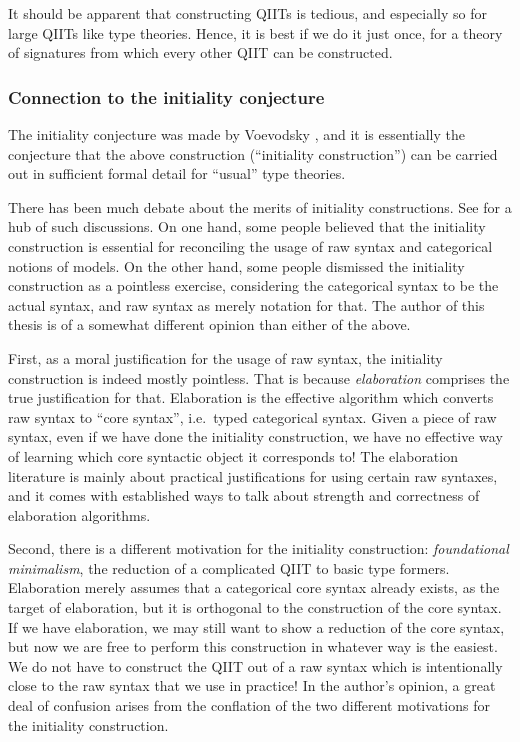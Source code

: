 \documentclass[12pt,a4paper,twoside,openany]{book}
\theoremstyle{remark}
\theoremstyle{definition}
\theoremstyle{theorem}
\begin{document}
It should be apparent that constructing QIITs is tedious, and especially so for
large QIITs like type theories. Hence, it is best if we do it just once, for a
theory of signatures from which every other QIIT can be constructed.

\subsubsection{Connection to the initiality conjecture}

The initiality conjecture was made by Voevodsky \cite{voevodsky-initiality}, and
it is essentially the conjecture that the above construction (``initiality
construction'') can be carried out in sufficient formal detail for ``usual''
type theories.

There has been much debate about the merits of initiality constructions. See
\cite{initiality-project} for a hub of such discussions.  On one hand, some
people believed that the initiality construction is essential for reconciling
the usage of raw syntax and categorical notions of models. On the other hand,
some people dismissed the initiality construction as a pointless exercise,
considering the categorical syntax to be the actual syntax, and raw syntax as
merely notation for that. The author of this thesis is of a somewhat different
opinion than either of the above.

First, as a moral justification for the usage of raw syntax, the initiality
construction is indeed mostly pointless. That is because \emph{elaboration}
comprises the true justification for that. Elaboration is the effective
algorithm which converts raw syntax to ``core syntax'', i.e.\ typed categorical
syntax. Given a piece of raw syntax, even if we have done the initiality
construction, we have no effective way of learning which core syntactic object it
corresponds to!  The elaboration literature is mainly about practical
justifications for using certain raw syntaxes, and it comes with established
ways to talk about strength and correctness of elaboration algorithms.

Second, there is a different motivation for the initiality construction:
\emph{foundational minimalism}, the reduction of a complicated QIIT to basic
type formers. Elaboration merely assumes that a categorical core syntax already
exists, as the target of elaboration, but it is orthogonal to the construction of
the core syntax. If we have elaboration, we may still want to show a reduction
of the core syntax, but now we are free to perform this construction in whatever
way is the easiest. We do not have to construct the QIIT out of a raw syntax
which is intentionally close to the raw syntax that we use in practice! In the
author's opinion, a great deal of confusion arises from the conflation of the
two different motivations for the initiality construction.
\end{document}

